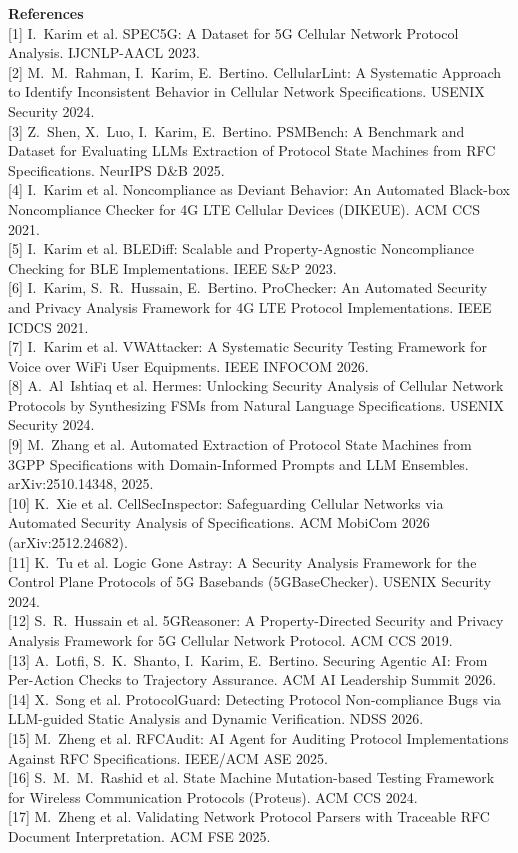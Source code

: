 \documentclass[11pt,letterpaper]{article}
\begin{document}
\vspace{2pt}
{\footnotesize
\textbf{References}\\[1pt]
\setlength{\parskip}{0pt}
[1] I.~Karim et al. SPEC5G: A Dataset for 5G Cellular Network Protocol Analysis. IJCNLP-AACL 2023.\\
{}[2] M.~M.~Rahman, I.~Karim, E.~Bertino. CellularLint: A Systematic Approach to Identify Inconsistent Behavior in Cellular Network Specifications. USENIX Security 2024.\\
{}[3] Z.~Shen, X.~Luo, I.~Karim, E.~Bertino. PSMBench: A Benchmark and Dataset for Evaluating LLMs Extraction of Protocol State Machines from RFC Specifications. NeurIPS D\&B 2025.\\
{}[4] I.~Karim et al. Noncompliance as Deviant Behavior: An Automated Black-box Noncompliance Checker for 4G LTE Cellular Devices (DIKEUE). ACM CCS 2021.\\
{}[5] I.~Karim et al. BLEDiff: Scalable and Property-Agnostic Noncompliance Checking for BLE Implementations. IEEE S\&P 2023.\\
{}[6] I.~Karim, S.~R.~Hussain, E.~Bertino. ProChecker: An Automated Security and Privacy Analysis Framework for 4G LTE Protocol Implementations. IEEE ICDCS 2021.\\
{}[7] I.~Karim et al. VWAttacker: A Systematic Security Testing Framework for Voice over WiFi User Equipments. IEEE INFOCOM 2026.\\
{}[8] A.~Al~Ishtiaq et al. Hermes: Unlocking Security Analysis of Cellular Network Protocols by Synthesizing FSMs from Natural Language Specifications. USENIX Security 2024.\\
{}[9] M.~Zhang et al. Automated Extraction of Protocol State Machines from 3GPP Specifications with Domain-Informed Prompts and LLM Ensembles. arXiv:2510.14348, 2025.\\
{}[10] K.~Xie et al. CellSecInspector: Safeguarding Cellular Networks via Automated Security Analysis of Specifications. ACM MobiCom 2026 (arXiv:2512.24682).\\
{}[11] K.~Tu et al. Logic Gone Astray: A Security Analysis Framework for the Control Plane Protocols of 5G Basebands (5GBaseChecker). USENIX Security 2024.\\
{}[12] S.~R.~Hussain et al. 5GReasoner: A Property-Directed Security and Privacy Analysis Framework for 5G Cellular Network Protocol. ACM CCS 2019.\\
{}[13] A.~Lotfi, S.~K.~Shanto, I.~Karim, E.~Bertino. Securing Agentic AI: From Per-Action Checks to Trajectory Assurance. ACM AI Leadership Summit 2026.\\
{}[14] X.~Song et al. ProtocolGuard: Detecting Protocol Non-compliance Bugs via LLM-guided Static Analysis and Dynamic Verification. NDSS 2026.\\
{}[15] M.~Zheng et al. RFCAudit: AI Agent for Auditing Protocol Implementations Against RFC Specifications. IEEE/ACM ASE 2025.\\
{}[16] S.~M.~M.~Rashid et al. State Machine Mutation-based Testing Framework for Wireless Communication Protocols (Proteus). ACM CCS 2024.\\
{}[17] M.~Zheng et al. Validating Network Protocol Parsers with Traceable RFC Document Interpretation. ACM FSE 2025.
}
\end{document}
